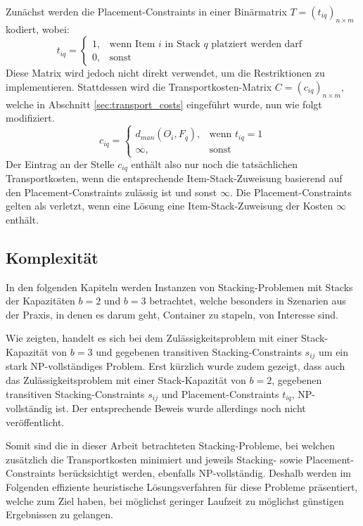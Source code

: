 Zunächst werden die Placement-Constraints in einer Binärmatrix $T = (t_{iq})_{n \times m}$ kodiert, wobei:
\[
    t_{iq} =
\begin{cases}
    1, & \text{wenn Item $i$ in Stack $q$ platziert werden darf }\\
    0, & \text{sonst}
\end{cases}
\]
Diese Matrix wird jedoch nicht direkt verwendet, um die Restriktionen zu implementieren. Stattdessen wird
die Transportkosten-Matrix $C = (c_{iq})_{n \times m}$, welche in Abschnitt \ref{sec:transport_costs} eingeführt wurde, nun wie folgt modifiziert.
\[
    c_{iq} =
\begin{cases}
    d_{man}(O_i, F_q), & \text{wenn $t_{iq} = 1$}\\
    \infty, & \text{sonst}
\end{cases}
\]
Der Eintrag an der Stelle $c_{iq}$ enthält also nur noch die tatsächlichen Transportkosten, wenn die
entsprechende Item-Stack-Zuweisung basierend auf den Placement-Constraints zulässig ist und sonst $\infty$.
Die Placement-Constraints gelten als verletzt, wenn eine Lösung eine Item-Stack-Zuweisung
der Kosten $\infty$ enthält.

\pagebreak

\subsection{Komplexität}
\label{sec:complexity}

In den folgenden Kapiteln werden Instanzen von Stacking-Problemen mit Stacks der Kapazitäten $b = 2$
und $b = 3 $ betrachtet, welche besonders in Szenarien aus der Praxis, in denen es darum geht,
Container zu stapeln, von Interesse sind.

Wie \citet{Bruns2015} zeigten, handelt es sich bei dem Zulässigkeitsproblem mit einer Stack-Kapazität von $b=3$ und gegebenen transitiven Stacking-Constraints $s_{ij}$ um ein stark NP-vollständiges Problem. Erst kürzlich wurde zudem gezeigt, dass auch das Zulässigkeitsproblem mit einer Stack-Kapazität von $b=2$, gegebenen transitiven
Stacking-Constraints $s_{ij}$ und Placement-Constraints $t_{iq}$, NP-vollständig ist. Der entsprechende Beweis
wurde allerdings noch nicht veröffentlicht.

Somit sind die in dieser Arbeit betrachteten Stacking-Probleme, bei welchen zusätzlich die Transportkosten minimiert
und jeweils Stacking- sowie Placement-Constraints berücksichtigt werden, ebenfalls NP-vollständig.
Deshalb werden im Folgenden effiziente heuristische Lösungsverfahren für diese Probleme präsentiert,
welche zum Ziel haben, bei möglichst geringer Laufzeit zu möglichst günstigen Ergebnissen zu gelangen.


